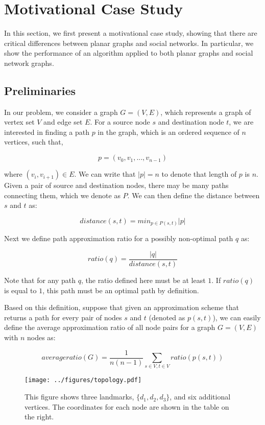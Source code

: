 \section{Motivational Case Study}
\label{motivationcase}

In this section, we first present a motivational case study, showing that there are critical differences between planar graphs and social networks. In particular, we show the performance of an algorithm applied to both planar graphs and social network graphs.

\subsection{Preliminaries}
\label{problemformulation}

In our problem, we consider a graph $G = (V,E)$, which represents a graph of vertex set $V$ and edge set $E$. For a source node $s$ and destination node $t$, we are interested in finding a path $p$ in the graph, which is an ordered sequence of $n$ vertices, such that,

\[
p = (v_0, v_1, ..., v_{n-1})
\]

where $(v_i,v_{i+1}) \in E$. We can write that $|p| = n$ to denote that length of $p$ is $n$. Given a pair of source and destination nodes, there may be many paths connecting them, which we denote as $P$. We can then define the distance between $s$ and $t$ as:

\[
distance(s,t) = min_{p\in P(s,t)}|p|
\]


Next we define path approximation ratio for a possibly non-optimal path $q$ as:

\[
ratio(q) = \frac{|q|}{distance(s,t)}
\]

Note that for any path $q$, the ratio defined here must be at least $1$. If $ratio(q)$ is equal to $1$, this path must be an optimal path by definition.

Based on this definition, suppose that given an approximation scheme that returns a path for every pair of nodes $s$ and $t$ (denoted as $p(s,t)$), we can easily define the average approximation ratio of all node pairs for a graph $G = (V,E)$ with $n$ nodes as:

\[
averageratio(G) = \frac{1}{n(n-1)}\sum_{s\in V, t\in V} ratio(p(s,t))
\]

\begin{figure}[t]
  \centering
  \texttt{[image: ../figures/topology.pdf]}
  \caption{This figure shows three landmarks, $\{d_1, d_2,d_3\}$, and six additional vertices. The coordinates for each node are shown in the table on the right.}
  \label{fig:lcr}
  \vspace{-3mm}
\end{figure}


